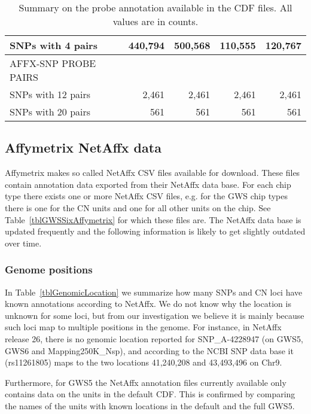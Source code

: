 \documentclass[10pt,a4paper]{article}
\begin{document}
\begin{table}[htp]
\begin{center}
\begin{tabular}{lrrrr}
SNPs with 4 pairs       &  440,794  &  500,568  &    110,555 &   120,767 \\
\hline
AFFX-SNP PROBE PAIRS     &	         &	  			 &	 				  &	 		      \\
SNPs with 12 pairs       &    2,461  &    2,461  &     2,461  &     2,461 \\
SNPs with 20 pairs       &      561  &      561  &       561  &       561 \\
\hline
\end{tabular}
\end{center}
\caption{Summary on the probe annotation available in the CDF files.  All values are in counts.}    %
\label{tblCdfProbes}
\end{table}



\subsection{Affymetrix NetAffx data}

Affymetrix makes so called NetAffx CSV files available for download.  These files contain annotation data exported from their NetAffx data base.  For each chip type there exists one or more NetAffx CSV files, e.g. for the GWS chip types there is one for the CN units and one for all other units on the chip.  See Table~\ref{tblGWSSixAffymetrix} for which these files are.
The NetAffx data base is updated frequently and the following information is likely to get slightly outdated over time. 

\subsubsection{Genome positions}
In Table~\ref{tblGenomicLocation} we summarize how many SNPs and CN loci have known annotations according to NetAffx.  
We do not know why the location is unknown for some loci, but from our investigation we believe it is mainly because such loci map to multiple positions in the genome.  For instance, in NetAffx release 26, there is no genomic location reported for SNP\_A-4228947 (on GWS5, GWS6 and Mapping250K\_Nsp), and according to the NCBI SNP data base it (rs11261805) maps to the two locations 41,240,208 and 43,493,496 on Chr9.

Furthermore, for GWS5 the NetAffx annotation files currently available only contains data on the units in the default CDF.  This is confirmed by comparing the names of the units with known locations in the default and the full GWS5.
\end{document}
